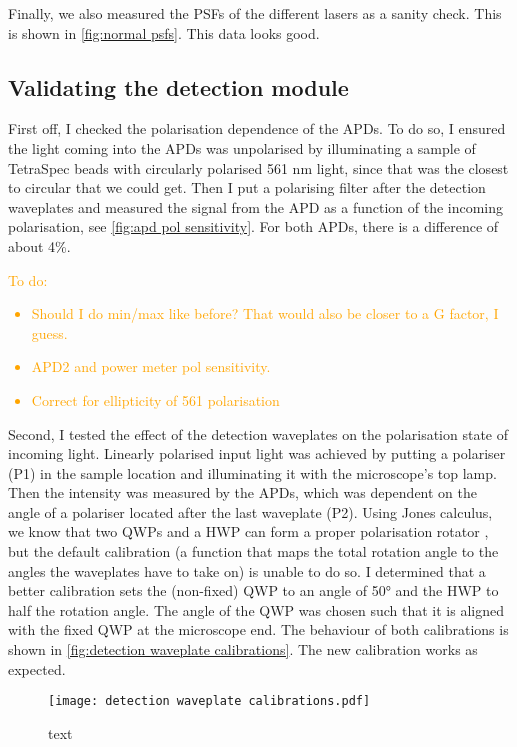 Finally, we also measured the PSFs of the different lasers as a sanity check. This is shown in \autoref{fig:normal psfs}. This data looks good.  

\subsection{Validating the detection module}

First off, I checked the polarisation dependence of the APDs. To do so, I ensured the light coming into the APDs was unpolarised by illuminating a sample of TetraSpec beads with circularly polarised 561 nm light, since that was the closest to circular that we could get. Then I put a polarising filter after the detection waveplates and measured the signal from the APD as a function of the incoming polarisation, see \autoref{fig:apd pol sensitivity}. For both APDs, there is a difference of about 4\%.

\textcolor{orange}{
To do:
	\begin{itemize}
		\item Should I do min/max like before? That would also be closer to a G factor, I guess.
		\item APD2 and power meter pol sensitivity.
		\item Correct for ellipticity of 561 polarisation
	\end{itemize}
} 

Second, I tested the effect of the detection waveplates on the polarisation state of incoming light. Linearly polarised input light was achieved by putting a polariser (P1) in the sample location and illuminating it with the microscope's top lamp. Then the intensity was measured by the APDs, which was dependent on the angle of a polariser located after the last waveplate (P2). Using Jones calculus, we know that two QWPs and a HWP can form a proper polarisation rotator , but the default calibration (a function that maps the total rotation angle to the angles the waveplates have to take on) is unable to do so. I determined that a better calibration sets the (non-fixed) QWP to an angle of 50° and the HWP to half the rotation angle. The angle of the QWP was chosen such that it is aligned with the fixed QWP at the microscope end. The behaviour of both calibrations is shown in \autoref{fig:detection waveplate calibrations}. The new calibration works as expected.

\begin{figure}
	\centering
	\texttt{[image: detection waveplate calibrations.pdf]}
	\caption{text}
	\label{fig:detection waveplate calibrations}
\end{figure}

